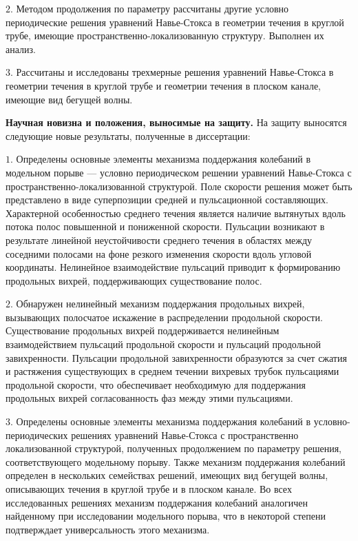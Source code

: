\noindent $2.$ Методом продолжения по параметру рассчитаны другие условно периодические решения уравнений Навье-Стокса в геометрии течения в круглой трубе, имеющие пространственно-локализованную структуру. Выполнен их анализ. %

\noindent $3.$ Рассчитаны и исследованы трехмерные решения уравнений Навье-Стокса в геометрии течения в круглой трубе и геометрии течения в плоском канале, имеющие вид бегущей волны. %


{\bf Научная новизна и положения, выносимые на защиту.} На защиту выносятся следующие новые результаты, полученные в диссертации:

\noindent $1.$ Определены основные элементы механизма поддержания колебаний в модельном порыве --- условно периодическом решении уравнений Навье-Стокса с пространственно-локализованной структурой. Поле скорости решения может быть представлено в виде суперпозиции средней и пульсационной составляющих. Характерной особенностью среднего течения является наличие вытянутых вдоль потока полос повышенной и пониженной скорости. Пульсации возникают в результате линейной неустойчивости среднего течения в областях между соседними полосами на фоне резкого изменения скорости вдоль угловой координаты. Нелинейное взаимодействие пульсаций приводит к формированию продольных вихрей, поддерживающих существование полос.

\noindent $2.$ Обнаружен нелинейный механизм поддержания продольных вихрей, вызывающих полосчатое искажение в распределении продольной скорости. Существование продольных вихрей поддерживается нелинейным взаимодействием пульсаций продольной скорости и пульсаций продольной завихренности. Пульсации продольной завихренности образуются за счет сжатия и растяжения существующих в среднем течении вихревых трубок пульсациями продольной скорости, что обеспечивает необходимую для поддержания продольных вихрей согласованность фаз между этими пульсациями. 

\noindent $3.$ Определены основные элементы механизма поддержания колебаний в условно-периодических решениях уравнений Навье-Стокса с пространственно локализованной структурой, полученных продолжением по параметру решения, соответствующего модельному порыву. Также механизм поддержания колебаний определен в нескольких семействах решений, имеющих вид бегущей волны, описывающих течения в круглой трубе и в плоском канале. Во всех исследованных решениях механизм поддержания колебаний аналогичен найденному при исследовании модельного порыва, что в некоторой степени подтверждает универсальность этого механизма. 

